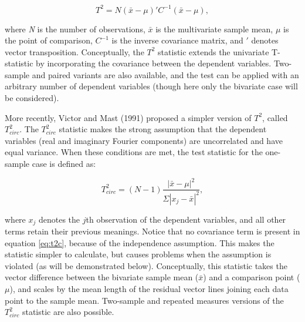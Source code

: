 \documentclass[]{article}
\begin{document}
\begin{equation}
\label{eq:t2eq}
T^2 = N(\bar{x} - \mu)' C^{-1} (\bar{x} - \mu),
\end{equation}

where \emph{N} is the number of observations, \(\bar{x}\) is the multivariate sample mean, \(\mu\) is the point of comparison, \(C^{-1}\) is the inverse covariance matrix, and \('\) denotes vector transposition. Conceptually, the \(T^2\) statistic extends the univariate T-statistic by incorporating the covariance between the dependent variables. Two-sample and paired variants are also available, and the test can be applied with an arbitrary number of dependent variables (though here only the bivariate case will be considered).

More recently, Victor and Mast (1991) proposed a simpler version of \(T^2\), called \(T^2_{circ}\). The \(T^2_{circ}\) statistic makes the strong assumption that the dependent variables (real and imaginary Fourier components) are uncorrelated and have equal variance. When these conditions are met, the test statistic for the one-sample case is defined as:

\begin{equation}
\label{eq:t2c}
T^2_{circ} = (N-1)\frac{|\bar{x}-\mu|^2}{\Sigma|x_j - \bar{x}|^2},
\end{equation}

where \(x_j\) denotes the \(j\)th observation of the dependent variables, and all other terms retain their previous meanings. Notice that no covariance term is present in equation \eqref{eq:t2c}, because of the independence assumption. This makes the statistic simpler to calculate, but causes problems when the assumption is violated (as will be demonstrated below). Conceptually, this statistic takes the vector difference between the bivariate sample mean (\(\bar{x}\)) and a comparison point (\(\mu\)), and scales by the mean length of the residual vector lines joining each data point to the sample mean. Two-sample and repeated measures versions of the \(T^2_{circ}\) statistic are also possible.
\end{document}
